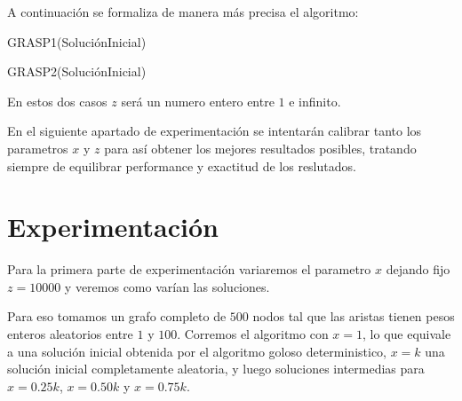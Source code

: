 A continuación se formaliza de manera más precisa el algoritmo:

\begin{algorithm}
  	\begin{algorithmic}[1]\parskip=1mm
		 \caption{ GRASP1(SoluciónInicial) }
	\end{algorithmic}
\end{algorithm}

\begin{algorithm}
  	\begin{algorithmic}[1]\parskip=1mm
		 \caption{ GRASP2(SoluciónInicial) }
	\end{algorithmic}
\end{algorithm}

En estos dos casos $z$ será un numero entero entre $1$ e infinito.

En el siguiente apartado de experimentación se intentarán calibrar tanto los parametros $x$ y $z$ para así obtener los mejores resultados posibles, tratando siempre de equilibrar performance y exactitud de los reslutados.

\section{Experimentación}

Para la primera parte de experimentación variaremos el parametro $x$ dejando fijo $z = 10000$ y veremos como varían las soluciones.

Para eso tomamos un grafo completo de $500$ nodos tal que las aristas tienen pesos enteros aleatorios entre $1$ y $100$. Corremos el algoritmo con $x=1$, lo que equivale a una solución inicial obtenida por el algoritmo goloso deterministico, $x=k$ una solución inicial completamente aleatoria, y luego soluciones intermedias para $x = 0.25 k$, $x = 0.50k$ y $x = 0.75 k$.


